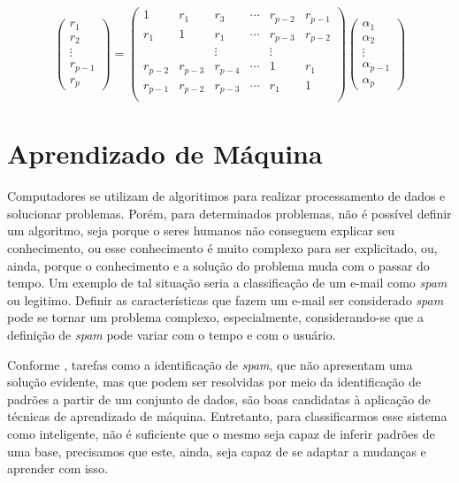 \documentclass[
    12pt,
    oneside,
    a4paper,
    english,
    brazil
]{abntex2}
\begin{document}
\begin{equation}
    \label{eq:yulewalker}
    \begin{pmatrix}
        r_1\\
        r_2\\
        \vdots\\
        r_{p-1}\\
        r_p
    \end{pmatrix} =
    \begin{pmatrix}
        1 & r_1 & r_3 & \cdots & r_{p-2} & r_{p-1} \\
        r_1 & 1 & r_1 & \cdots & r_{p-3} & r_{p-2} \\
        & & \vdots & & \vdots & \\
        r_{p-2} & r_{p-3} & r_{p-4} & \cdots & 1 & r_1 \\
        r_{p-1} & r_{p-2} & r_{p-3} & \cdots & r_1 & 1 \\
    \end{pmatrix}
    \begin{pmatrix}
        \alpha_1\\
        \alpha_2\\
        \vdots\\
        \alpha_{p-1}\\
        \alpha_p
    \end{pmatrix}
\end{equation}

\section{Aprendizado de Máquina}

Computadores se utilizam de algoritimos  para realizar processamento de dados e
solucionar  problemas.  Porém,  para  determinados problemas,  não  é  possível
definir um  algoritmo, seja porque o  seres humanos não conseguem  explicar seu
conhecimento, ou esse conhecimento é  muito complexo para ser  explicitado, ou,
ainda, porque  o conhecimento  e a  solução do  problema muda  com o  passar do
tempo.  Um exemplo  de tal  situação seria  a classificação  de um  e-mail como
\textit{spam} ou legitimo.  Definir as características que fazem  um e-mail ser
considerado \textit{spam}  pode se  tornar um problema complexo, especialmente,
considerando-se que  a definição  de \textit{spam}  pode variar  com o  tempo e
com o usuário.

Conforme , tarefas como a identificação de \textit{spam}, que
não apresentam  uma solução  evidente, mas  que podem  ser resolvidas  por meio
da  identificação  de padrões  a  partir  de um  conjunto  de  dados, são  boas
candidatas à aplicação de técnicas  de aprendizado de máquina. Entretanto, para
classificarmos esse sistema como inteligente, não é suficiente que o mesmo seja
capaz de inferir padrões de uma base, precisamos que este, ainda, seja capaz de
se adaptar a mudanças e aprender com isso.
\end{document}
